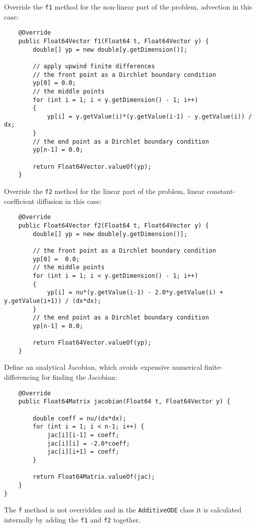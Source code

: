 \documentclass[10pt,letterpaper]{article}
\begin{document}
Override the {\tt f1} method for the non-linear part of the problem, advection in this case:

\begin{lstlisting}
    @Override
    public Float64Vector f1(Float64 t, Float64Vector y) {
        double[] yp = new double[y.getDimension()];

        // apply upwind finite differences
        // the front point as a Dirchlet boundary condition
        yp[0] = 0.0;
        // the middle points
        for (int i = 1; i < y.getDimension() - 1; i++)
        {
            yp[i] = y.getValue(i)*(y.getValue(i-1) - y.getValue(i)) / dx;
        }
        // the end point as a Dirchlet boundary condition
        yp[n-1] = 0.0;

        return Float64Vector.valueOf(yp);
    }
\end{lstlisting}

Override the {\tt f2} method for the linear part of the problem, linear
constant-coefficient diffusion in this case:

\begin{lstlisting}
    @Override
    public Float64Vector f2(Float64 t, Float64Vector y) {
        double[] yp = new double[y.getDimension()];

        // the front point as a Dirchlet boundary condition
        yp[0] =  0.0;
        // the middle points
        for (int i = 1; i < y.getDimension() - 1; i++)
        {
            yp[i] = nu*(y.getValue(i-1) - 2.0*y.getValue(i) + y.getValue(i+1)) / (dx*dx);
        }
        // the end point as a Dirchlet boundary condition
        yp[n-1] = 0.0;

        return Float64Vector.valueOf(yp);
    }
\end{lstlisting}

Define an analytical Jacobian, which avoids expensive numerical
finite-differencing for finding the Jacobian:

\begin{lstlisting}
    @Override
    public Float64Matrix jacobian(Float64 t, Float64Vector y) {

        double coeff = nu/(dx*dx);
        for (int i = 1; i < n-1; i++) {
            jac[i][i-1] = coeff;
            jac[i][i] = -2.0*coeff;
            jac[i][i+1] = coeff;
        }

        return Float64Matrix.valueOf(jac);
    }
}
\end{lstlisting}

The {\tt f} method is not overridden and in the {\tt AdditiveODE} class it is
calculated internally by adding the {\tt f1} and {\tt f2} together.
\end{document}
